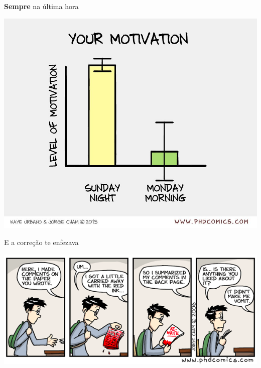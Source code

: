 \documentclass{beamer}
\begin{document}
\begin{frame}{{\bf Sempre} na última hora}
  \begin{center}
    \includegraphics[height=.75\textheight]{Encerramento/phdcomics-motivation}

    \vfill
  \end{center}
\end{frame}

\begin{frame}{E a correção te enfezava}
  \begin{center}
    \includegraphics[width=.8\textwidth]{Encerramento/phdcomics-correcao}

    \vfill
  \end{center}
\end{frame}
\end{document}
